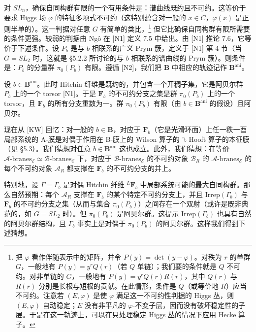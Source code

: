 \documentclass[11pt,a4paper]{article}
\begin{document}
对 $SL_n$，确保自同构群有限的一个有用条件是：谱曲线既约且不可约。这等价于要求 Higgs 场 $\varphi$ 的特征多项式不可约（这特别蕴含对一般的 $x\in C$，$\varphi(x)$ 是正则半单的）。这一判据对任意 $G$ 有简单的类比，\footnote{把 $\varphi$ 看作伴随表示中的矩阵，并令 $P(y)=\det(y-\varphi)$。对秩为 $r$ 的单群 $G$，一般地有 $P(y)=y^rQ(r)$（若 $Q$ 单链）；我们要的条件就是 $Q$ 不可约。对非单链的 $G$，一般地有 $P(y)=y^rQ(r)R(r)$，其中 $Q(r)$ 与 $R(r)$ 分别是长根与短根的贡献。在此情形，条件是 $Q$（或等价地 $R$）应当不可约。注意若 $(E,\varphi)$ 是使 $\varphi$ 满足这一不可约性判据的 Higgs 丛，则 $(E,\varphi)$ 自动稳定；$E$ 没有非平凡的 $\varphi$-不变子层，因而没有破坏稳定性的子层。于是在这一轨迹上，可以在只处理稳定 Higgs 丛的情况下应用 Hecke 算子。}
但它比确保自同构群有限所需要的条件更强。较弱的判据由 Ngô 在 [N1] 定义 7.5 中给出。由 [N1] 推论 7.6，它等价于下述条件。设 $P_b$ 是与 $b$ 相联系的广义 Prym 簇，定义于 [N1] 第 4 节（当 $G=SL_2$ 时，这就是 §5.2.2 所讨论的与 $b$ 相联系的谱曲线的 Prym 簇）。则条件是：$P_b$ 的分量群 $\pi_0(P_b)$ 有限。遵循 [N2]，我们把 $\boldsymbol{B}$ 中相应的轨迹记作 $\boldsymbol{B}^{\mathrm{ani}}$。


设 $b\in\boldsymbol{B}^{\mathrm{ani}}$。此时 Hitchin 纤维是既约的，并包含一个开稠子集，它是阿贝尔群 $P_b$ 上的一个 torsor [N1]。于是 $\boldsymbol{F}_b$ 的不可约分支之集是群 $\pi_0(P_b)$ 上的一个 torsor，且 $\boldsymbol{F}_b$ 的所有分支重数为一。群 $\pi_0(P_b)$ 有限（由 $b\in\boldsymbol{B}^{\mathrm{ani}}$ 的假设）且阿贝尔。

现在从 [KW] 回忆：对一般的 $b\in\boldsymbol{B}$，对应于 $\boldsymbol{F}_b$（它是光滑环面）上任一秩一酉局部系统的 A-膜是对偶于作用在 B-膜上的 Wilson 算子的 't Hooft 算子的本征膜（见 §5.3）。我们猜想对任意 $b\in\boldsymbol{B}^{\mathrm{ani}}$ 这也成立。此外，我们猜想：在等价 $\mathcal{A}\text{-branes}_{\mathcal{E}}\simeq\mathcal{B}\text{-branes}_{\mathcal{E}}$ 下，对应于 $\mathcal{B}\text{-branes}_{\mathcal{E}}$ 的不可约对象 $\mathcal{B}_R$ 的 $\mathcal{A}\text{-branes}_{\mathcal{E}}$ 的每个不可约对象 $\mathcal{A}_R$ 都支撑在 $\boldsymbol{F}_b$ 的不可约分支的并上。

特别地，设 $\Gamma=\Gamma_b$ 是对偶 Hitchin 纤维 ${}^{L}\boldsymbol{F}_b$ 中局部系统可能的最大自同构群。那么自然预期：每个 $\mathcal{A}_R$ 支撑在 $\boldsymbol{F}_b$ 的某个特定不可约分支上，并且 $\mathrm{Irrep}(\Gamma_b)$ 与 $\boldsymbol{F}_b$ 的不可约分支之集（从而与集合 $\pi_0(P_b)$）之间存在一个双射（或许是既非典范的，如 $G=SL_2$ 时）。但 $\pi_0(P_b)$ 是阿贝尔群。这提示 $\mathrm{Irrep}(\Gamma_b)$ 也具有自然的阿贝尔群结构，且 $\Gamma_b$ 事实上是对偶于 $\pi_0(P_b)$ 的阿贝尔群。这样我们得到下述猜想。
\end{document}
